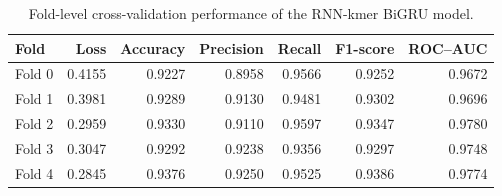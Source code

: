 \begin{table}[H]
\centering
\small
\caption{Fold-level cross-validation performance of the RNN-kmer BiGRU model.}
\label{tab:rnn_fold_results}
\begin{tabular}{lrrrrrr}
\toprule
Fold & Loss & Accuracy & Precision & Recall & F1-score & ROC--AUC \\
\midrule
Fold 0 & 0.4155 & 0.9227 & 0.8958 & 0.9566 & 0.9252 & 0.9672 \\
Fold 1 & 0.3981 & 0.9289 & 0.9130 & 0.9481 & 0.9302 & 0.9696 \\
Fold 2 & 0.2959 & 0.9330 & 0.9110 & 0.9597 & 0.9347 & 0.9780 \\
Fold 3 & 0.3047 & 0.9292 & 0.9238 & 0.9356 & 0.9297 & 0.9748 \\
Fold 4 & 0.2845 & 0.9376 & 0.9250 & 0.9525 & 0.9386 & 0.9774 \\
\bottomrule
\end{tabular}
\end{table}

\FloatBarrier